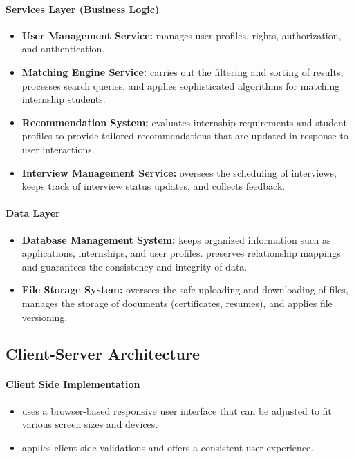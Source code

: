 \paragraph{Services Layer (Business Logic)}
\begin{itemize}
    \item \textbf{User Management Service:} manages user profiles, rights, authorization, and authentication.
    \item \textbf{Matching Engine Service:} carries out the filtering and sorting of results, processes search queries, and applies sophisticated algorithms for matching internship students.
    \item \textbf{Recommendation System:} evaluates internship requirements and student profiles to provide tailored recommendations that are updated in response to user interactions.
    \item \textbf{Interview Management Service:} oversees the scheduling of interviews, keeps track of interview status updates, and collects feedback.
\end{itemize}

\paragraph{Data Layer}
\begin{itemize}
    \item \textbf{Database Management System:} keeps organized information such as applications, internships, and user profiles. preserves relationship mappings and guarantees the consistency and integrity of data.
    \item \textbf{File Storage System:} oversees the safe uploading and downloading of files, manages the storage of documents (certificates, resumes), and applies file versioning.
\end{itemize}

\subsection{Client-Server Architecture}
\paragraph{Client Side Implementation}
\begin{itemize}
    \item uses a browser-based responsive user interface that can be adjusted to fit various screen sizes and devices.
    \item applies client-side validations and offers a consistent user experience.
\end{itemize}

